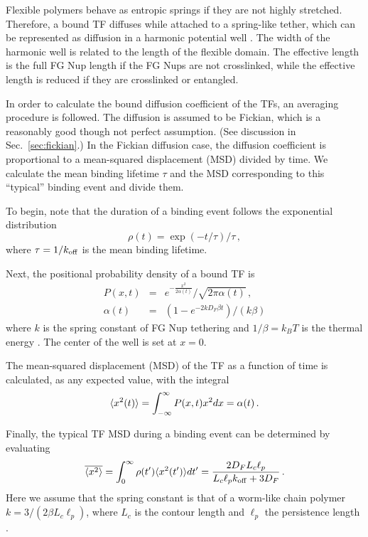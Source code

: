 Flexible polymers behave as entropic springs \cite{howard01} if they are not highly stretched. Therefore, a bound TF diffuses while attached to a spring-like tether, which can be represented as diffusion in a harmonic potential well .  The width of the harmonic well is related to the length of the flexible domain.  The effective length is the full FG Nup length if the FG Nups are not crosslinked, while the effective length is reduced if they are crosslinked or entangled\cite{ribbeck01}.  

In order to calculate the bound diffusion coefficient of the TFs, an averaging procedure is followed.  The diffusion is assumed to be Fickian, which is a reasonably good though not perfect assumption. (See discussion in Sec.~\ref{sec:fickian}.)  In the Fickian diffusion case, the diffusion coefficient is proportional to a mean-squared displacement (MSD) divided by time.  We calculate the mean binding lifetime $\tau$ and the MSD corresponding to this ``typical'' binding event and divide them.

To begin, note that the duration of a binding event follows the exponential distribution 
\begin{equation}
\rho (t) = \exp(-t/\tau)/\tau\,,
\end{equation}
where $\tau = 1/k_{\rm off}$ is the mean binding lifetime.

Next, the positional probability density of a bound TF is 
\begin{eqnarray}
P(x,t) &=& e^{-\frac{x^2}{2 \alpha(t)}}/\sqrt{2\pi \alpha(t)}\,,\\
\alpha(t) &=& (1-e^{-2kD_F\beta t})/(k\beta)
\end{eqnarray}
 where $k$ is the spring constant of FG Nup tethering and $1/\beta = k_BT$ is the thermal energy \cite{doi88}.  The center of the well is set at $x=0$.

The mean-squared displacement (MSD) of the TF as a function of time is calculated, as any expected value, with the integral
\begin{equation}
\langle x^2(t) \rangle = \int_{-\infty}^{\infty} P(x,t) x^2 dx = \alpha(t)\,.
\end{equation}

Finally, the typical TF MSD during a binding event can be determined by evaluating
\begin{equation}\label{eq:sho}
  \overline{\langle x^2 \rangle} = \int_0^{\infty} \rho(t') \langle x^2(t') \rangle dt' = \frac{2D_F L_c
    \ell_p}{L_c \ell_p k_{\rm off}+ 3D_F}\,. 
\end{equation} %
Here we assume that the spring constant is that of a worm-like chain polymer $k = 3/(2\beta L_c \ell_p)$, where $L_c$ is the contour length and $\ell_p$ the persistence length \cite{howard01}.


